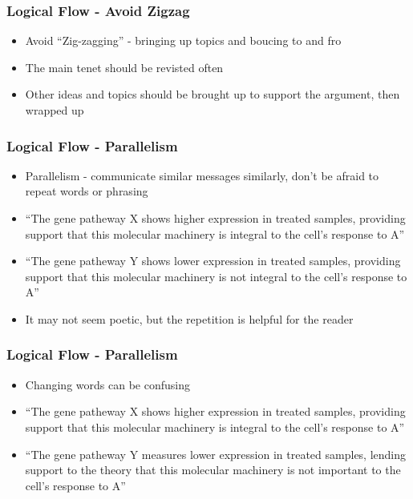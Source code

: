 \documentclass[14pt,handout]{beamer}
\begin{document}
\begin{frame}
\frametitle{Logical Flow - Avoid Zigzag}
\begin{itemize}
	\item<+-> Avoid ``Zig-zagging'' - bringing up topics and boucing to and fro
	\item<+-> The main tenet should be revisted often
	\item<+-> Other ideas and topics should be brought up to support the argument, then wrapped up
\end{itemize}
\end{frame}

\begin{frame}
\frametitle{Logical Flow - Parallelism}
\begin{itemize}
	\item<+-> Parallelism - communicate similar messages similarly, don't be afraid to repeat words or phrasing
	\item<+-> ``The gene patheway X shows higher expression in treated samples, providing support that this molecular machinery is integral to the cell's response to A''
	\item<+-> ``The gene patheway Y shows lower expression in treated samples, providing support that this molecular machinery is not integral to the cell's response to A''
	\item<+-> It may not seem poetic, but the repetition is helpful for the reader
\end{itemize}
\end{frame}

\begin{frame}
\frametitle{Logical Flow - Parallelism}
\begin{itemize}
	\item<+-> Changing words can be confusing
	\item<+-> ``The gene patheway X shows higher expression in treated samples, providing support that this molecular machinery is integral to the cell's response to A''
	\item<+-> ``The gene patheway Y measures lower expression in treated samples, lending support to the theory that this molecular machinery is not important to the cell's response to A''
\end{itemize}
\end{frame}

\end{document}

